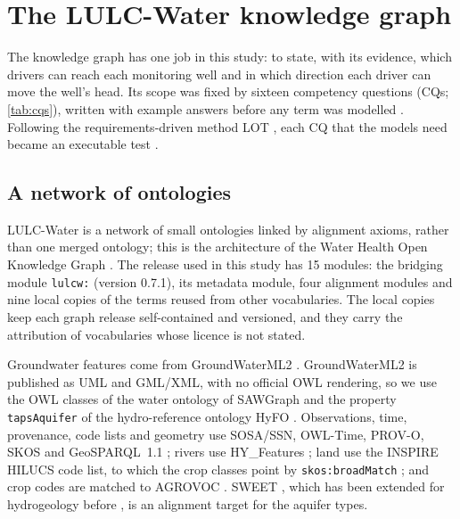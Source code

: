 \section{The LULC-Water knowledge graph}\label{sec:kg}

The knowledge graph has one job in this study: to state, with its evidence, which drivers can reach
each monitoring well and in which direction each driver can move the well's head. Its scope was
fixed by sixteen competency questions (CQs; \cref{tab:cqs}), written with example answers before
any term was modelled \citep{Gruninger1995The}. Following the requirements-driven method LOT
\citep{Povedavillalon2022Lot}, each CQ that the models need became an executable test
\citep{Wisniewski2019Analysis}.

\subsection{A network of ontologies}\label{sec:kg-network}

LULC-Water is a network of small ontologies linked by alignment axioms, rather than one merged
ontology; this is the architecture of the Water Health Open Knowledge Graph \citep{Lippolis2025The}.
The release used in this study has 15 modules: the bridging module \texttt{lulcw:} (version 0.7.1),
its metadata module, four alignment modules and nine local copies of the terms reused from other
vocabularies. The local copies keep each graph release self-contained and versioned, and they
carry the attribution of vocabularies whose licence is not stated.

Groundwater features come from GroundWaterML2 \citep{Brodaric2018Enabling}. GroundWaterML2 is
published as UML and GML/XML, with no official OWL rendering, so we use the OWL classes of the
water ontology of SAWGraph \citep{SAWGraph2026Water}
and the property \texttt{tapsAquifer} of the hydro-reference ontology HyFO \citep{Hahmann2018Using}.
Observations, time, provenance, code lists and geometry use SOSA/SSN, OWL-Time, PROV-O, SKOS and
GeoSPARQL~1.1 \citep{W3C2017Ssn,Janowicz2019Sosa,W3C2017Time,W3C2013ProvO,W3C2009Skos,Car2022Geosparql};
rivers use HY\_Features \citep{OGC2018HyFeatures};
land use the INSPIRE HILUCS code list, to which the crop classes point by
\texttt{skos:broadMatch} \citep{INSPIRE2026Hilucs};
and crop codes are matched to AGROVOC \citep{Caracciolo2013The}.
SWEET \citep{Raskin2005Knowledge},
which has been extended for hydrogeology before \citep{Tripathi2008Developing}, is an alignment
target for the aquifer types.

